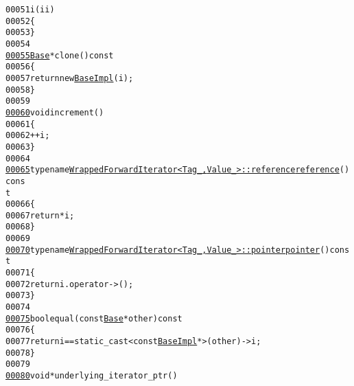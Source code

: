 \begin{footnotesize}
\begin{alltt}
00051             i(ii)
00052         \{
00053         \}
00054 
\hypertarget{wrapped__forward__iterator-impl_8hh_source_l00055}{}\hyperlink{structeos_1_1WrappedForwardIterator_1_1BaseImpl_afe3d32be8e6bd2788db24f89e90ceef9}{00055}         \hyperlink{structeos_1_1WrappedForwardIterator_1_1Base}{Base} * clone()\textcolor{keyword}{ const}
00056 \textcolor{keyword}{        }\{
00057             \textcolor{keywordflow}{return} \textcolor{keyword}{new} \hyperlink{structeos_1_1WrappedForwardIterator_1_1BaseImpl}{BaseImpl}(i);
00058         \}
00059 
\hypertarget{wrapped__forward__iterator-impl_8hh_source_l00060}{}\hyperlink{structeos_1_1WrappedForwardIterator_1_1BaseImpl_ac6565ae3236b5b128d671a1011f9c9ee}{00060}         \textcolor{keywordtype}{void} increment()
00061         \{
00062             ++i;
00063         \}
00064 
\hypertarget{wrapped__forward__iterator-impl_8hh_source_l00065}{}\hyperlink{structeos_1_1WrappedForwardIterator_1_1BaseImpl_a61c99fb9827d32e094355f8c152e65f0}{00065}         \textcolor{keyword}{typename} \hyperlink{classeos_1_1WrappedForwardIterator}{WrappedForwardIterator<Tag_, Value_>::reference} \hyperlink{classeos_1_1WrappedForwardIterator_ac7ba4ace12142ac73d97df5d555a4c18}{reference}()\textcolor{keyword}{ cons
      t}
00066 \textcolor{keyword}{        }\{
00067             \textcolor{keywordflow}{return} *i;
00068         \}
00069 
\hypertarget{wrapped__forward__iterator-impl_8hh_source_l00070}{}\hyperlink{structeos_1_1WrappedForwardIterator_1_1BaseImpl_ad11775ce759f6aa3eff84e67b5e859fd}{00070}         \textcolor{keyword}{typename} \hyperlink{classeos_1_1WrappedForwardIterator}{WrappedForwardIterator<Tag_, Value_>::pointer} \hyperlink{classeos_1_1WrappedForwardIterator_addb7c63e8b8d4be0a65ded32a4cb7cb9}{pointer}()\textcolor{keyword}{ const}
00071 \textcolor{keyword}{        }\{
00072             \textcolor{keywordflow}{return} i.operator-> ();
00073         \}
00074 
\hypertarget{wrapped__forward__iterator-impl_8hh_source_l00075}{}\hyperlink{structeos_1_1WrappedForwardIterator_1_1BaseImpl_a07f6ef7a9f4c21de044aca1d09aed9f7}{00075}         \textcolor{keywordtype}{bool} equal(\textcolor{keyword}{const} \hyperlink{structeos_1_1WrappedForwardIterator_1_1Base}{Base} * other)\textcolor{keyword}{ const}
00076 \textcolor{keyword}{        }\{
00077             \textcolor{keywordflow}{return} i == \textcolor{keyword}{static\_cast<}\textcolor{keyword}{const }\hyperlink{structeos_1_1WrappedForwardIterator_1_1BaseImpl}{BaseImpl} *\textcolor{keyword}{>}(other)->i;
00078         \}
00079 
\hypertarget{wrapped__forward__iterator-impl_8hh_source_l00080}{}\hyperlink{structeos_1_1WrappedForwardIterator_1_1BaseImpl_aab9c324066b8488f0f84395de5b02dfc}{00080}         \textcolor{keywordtype}{void} * underlying\_iterator\_ptr()

\end{alltt}
\end{footnotesize}

